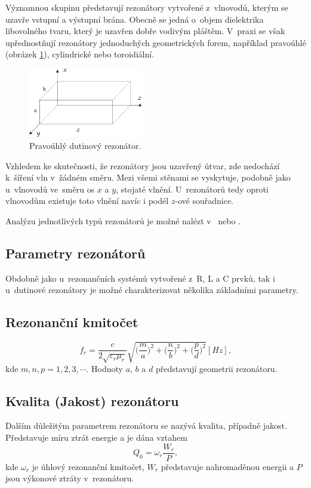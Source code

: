 Významnou skupinu představují rezonátory vytvořené z~vlnovodů, kterým se uzavře vstupní a výstupní brána. Obecně se jedná o~objem dielektrika libovolného tvaru, který je uzavřen dobře vodivým pláštěm. V~praxi se však upřednostňují rezonátory jednoduchých geometrických forem, například pravoúhlé (obrázek \ref{obr:evlny_rezonator}), cylindrické nebo toroidiální. 
\begin{figure}[!h]
	\centering
	\includegraphics[width=5cm]{evlny_rezonator.png}
	\caption{Pravoúhlý dutinový rezonátor. \cite{tripak}}
	\label{obr:evlny_rezonator}
\end{figure}

Vzhledem ke skutečnosti, že rezonátory jsou uzavřený útvar, zde nedochází k~šíření vln v~žádném směru. Mezi všemi stěnami se vyskytuje, podobně jako u~vlnovodů ve~směru os $x$ a $y$, stojaté vlnění. U~rezonátorů tedy oproti vlnovodům existuje toto vlnění navíc i podél $z$-ové souřadnice. 

Analýzu jednotlivých typů rezonátorů je možné nalézt v~\cite{emp} nebo \cite{tripak}.

\subsection{Parametry rezonátorů}
Obdobně jako u~rezonančních systémů vytvořené z~R, L a C prvků, tak i u~dutinové rezonátory je možné charakterizovat několika základními parametry.
\subsection*{Rezonanční kmitočet}
\begin{displaymath}
	f_r = \frac{c}{2\sqrt{\varepsilon_r \mu_r}}\sqrt{\bigg(\frac{m}{a}\bigg)^{2} + \bigg(\frac{n}{b}\bigg)^{2} + \bigg(\frac{p}{d}\bigg)^{2}}\unit{[Hz]},
\end{displaymath}
kde $m, n, p = 1, 2, 3,\cdots$. Hodnoty $a$, $b$ a $d$ představují geometrii rezonátoru.
\subsection*{Kvalita (Jakost) rezonátoru}
Dalším důležitým parametrem rezonátoru se nazývá kvalita, případně jakost. Představuje míru ztrát energie a je dána vztahem
\begin{displaymath}
	Q_0 = \omega_r \frac{W_{r}}{P},
\end{displaymath}
kde $\omega_r$ je úhlový rezonanční kmitočet, $W_r$ představuje nahromaděnou  energii a $P$ jsou výkonové ztráty v~rezonátoru.
\newpage
